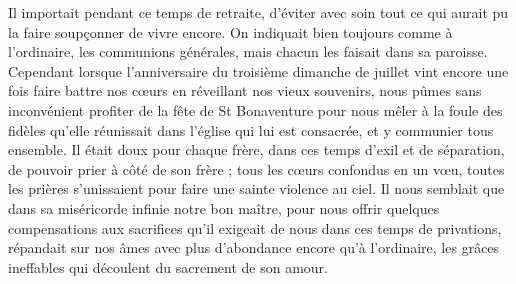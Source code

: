 Il importait pendant ce temps de retraite, d'éviter avec soin tout
ce qui aurait pu la faire soupçonner de vivre encore. On indiquait bien toujours comme à l'ordinaire, les communions générales, mais chacun les faisait dans sa paroisse. Cependant lorsque l'anniversaire du troisième dimanche de juillet vint encore une fois faire battre nos cœurs en réveillant nos vieux souvenirs, nous pûmes sans inconvénient profiter de la fête de St Bonaventure pour nous mêler à la foule des fidèles qu'elle réunissait dans l'église qui lui est consacrée, et y communier tous ensemble. Il était doux pour chaque frère, dans ces temps d'exil et de séparation, de pouvoir prier à côté de son frère ; tous les cœurs confondus en un vœu, toutes les prières s'unissaient pour faire une sainte violence au ciel. Il nous semblait que dans sa miséricorde infinie notre bon maître, pour nous offrir quelques compensations aux sacrifices qu'il exigeait de nous dans ces temps de privations, répandait sur nos âmes avec plus d'abondance encore qu'à l'ordinaire, les grâces ineffables qui découlent du sacrement de son amour.

